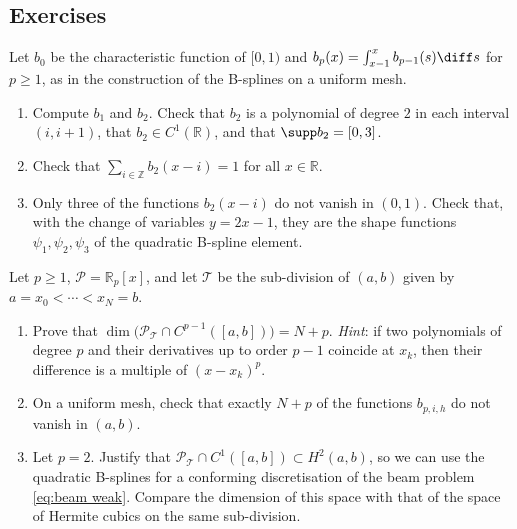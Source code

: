 \subsection*{Exercises}
\begin{exercises}
    \ex Let $b_0$ be the characteristic function of $[0,1)$ and $b_p(x) = \int_{x-1}^x b_{p-1}(s) \diff s$ for $p \ge 1$, as in the construction of the B-splines on a uniform mesh.
    \begin{enumerate}[label=\roman*)]
        \item Compute $b_1$ and $b_2$. Check that $b_2$ is a polynomial of degree $2$ in each interval $(i, i+1)$, that $b_2 \in C^1(\mathbb R)$, and that $\supp b_2 = [0,3]$.
        \item Check that $\sum_{i \in \mathbb Z} b_2(x - i) = 1$ for all $x \in \mathbb R$.
        \item Only three of the functions $b_2(x - i)$ do not vanish in $(0,1)$. Check that, with the change of variables $y = 2x - 1$, they are the shape functions $\psi_1, \psi_2, \psi_3$ of the quadratic B-spline element.
    \end{enumerate}

    \ex Let $p \ge 1$, $\mathcal P = \mathbb R_p[x]$, and let $\mathcal T$ be the sub-division of $(a,b)$ given by \mbox{$a = x_0 < \cdots < x_N = b$}.
    \begin{enumerate}[label=\roman*)]
        \item Prove that $\dim \big( \mathcal P_{\mathcal T} \cap C^{p-1}([a,b]) \big) = N + p$.
              \emph{Hint}: if two polynomials of degree $p$ and their derivatives up to order $p-1$ coincide at $x_k$, then their difference is a multiple of $(x - x_k)^p$.
        \item On a uniform mesh, check that exactly $N + p$ of the functions $b_{p,i,h}$ do not vanish in $(a,b)$.
        \item Let $p = 2$. Justify that $\mathcal P_{\mathcal T} \cap C^1([a,b]) \subset H^2(a,b)$, so we can use the quadratic B-splines for a conforming discretisation of the beam problem \eqref{eq:beam weak}.
              Compare the dimension of this space with that of the space of Hermite cubics on the same sub-division.
    \end{enumerate}
\end{exercises}